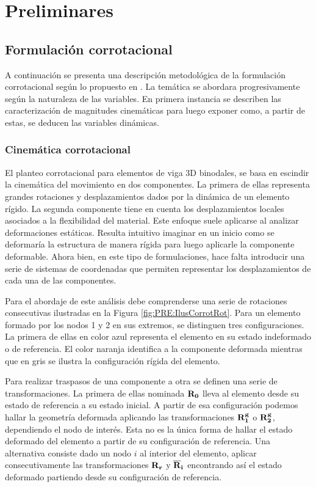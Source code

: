 \chapter{Preliminares}
\linenumbers
\section{Formulación corrotacional}\label{Sec:PRE:CorrotFormul}

A continuación se presenta una descripción metodológica de la formulación corrotacional según lo propuesto en \citep{Le2014}. La temática se abordara progresivamente según la naturaleza de las variables. En primera instancia se describen las caracterización de magnitudes cinemáticas para luego exponer como, a partir de estas, se deducen las variables dinámicas. 

\subsection{Cinemática corrotacional}\label{Subsec:PRE:CienmaticCorrot}

El planteo corrotacional para elementos de viga 3D binodales, se basa en escindir la cinemática del movimiento en dos componentes. La primera de ellas representa grandes rotaciones y desplazamientos dados por la dinámica de un elemento rígido. La segunda componente tiene en cuenta los desplazamientos locales asociados a la flexibilidad del material. Este enfoque suele aplicarse al analizar deformaciones estáticas. Resulta intuitivo imaginar en un inicio como se deformaría la estructura de manera rígida para luego aplicarle la componente deformable. Ahora bien, en este tipo de formulaciones, hace falta introducir una serie de sistemas de coordenadas que permiten representar los desplazamientos de cada una de las componentes.

Para el abordaje de este análisis debe comprenderse una serie de rotaciones consecutivas ilustradas en la Figura \ref{fig:PRE:IlusCorrotRot}. Para un elemento formado por los nodos 1 y 2 en sus extremos, se distinguen tres configuraciones. La primera de ellas en color azul representa el elemento en su estado indeformado o de referencia. El color naranja identifica a la componente deformada mientras que en gris se ilustra la configuración rígida del elemento. 

Para realizar traspasos de una componente a otra se definen una serie de transformaciones. La primera de ellas nominada $\bf{R}_0$ lleva al elemento desde su estado de referencia a su estado inicial. A partir de esa configuración podemos hallar la geometría deformada aplicando las transformaciones $\bf{R}_1^g$ o $\bf{R}_2^g$, dependiendo el nodo de interés. Esta no es la única forma de hallar el estado deformado del elemento a partir de su configuración de referencia. Una alternativa consiste dado un nodo $i$ al interior del elemento, aplicar consecutivamente las transformaciones $\bf{R}_r$ y $\bf{\overline{R}}_i$ encontrando así el estado deformado partiendo desde su configuración de referencia.  

